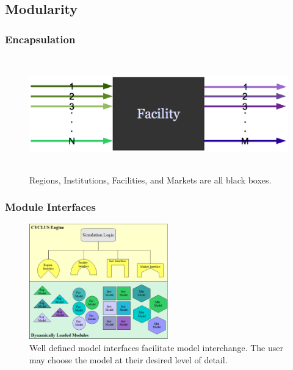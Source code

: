 \documentclass[9pt]{beamer}
\begin{document}
\subsection{Modularity}
\begin{frame}[ctb!]
  \frametitle{Encapsulation}
  \begin{figure}[htbp!]
    \begin{center}
      \includegraphics[height=5cm]{facility.eps}
    \end{center}
    \caption{ Regions, Institutions, Facilities, and Markets are all
    black boxes.} 
    \label{fig:sinkfacility}
  \end{figure}
\end{frame}
\begin{frame}[ctb!]
  \frametitle{Module Interfaces}
  \begin{figure}[htbp!]
    \begin{center}
      \includegraphics[height=5cm]{interfaces.eps}
    \caption{Well defined model interfaces facilitate model 
    interchange. The user may choose the model at their desired level  
    of detail.}
    \label{fig:interfaces}
    \end{center}
  \end{figure}
\end{frame}
\end{document}
